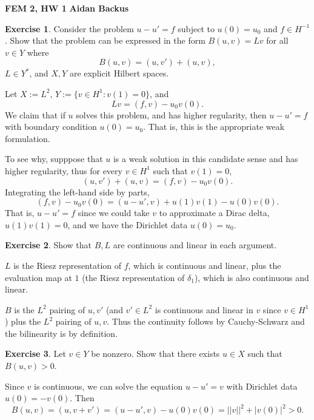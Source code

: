 \documentclass[10pt]{article}
\theoremstyle{definition}
\newtheorem{exer}{Exercise}
\begin{document}
\noindent
\large\textbf{FEM 2, HW 1} \hfill \textbf{Aidan Backus} \\

\begin{exer}
Consider the problem $u - u' = f$ subject to $u(0) = u_0$ and $f \in H^{-1}$.
Show that the problem can be expressed in the form $B(u, v) = Lv$ for all $v \in Y$ where
$$B(u, v) = (u, v') + (u, v),$$
$L \in Y^*$, and $X, Y$ are explicit Hilbert spaces.
\end{exer}

Let $X := L^2$, $Y := \{v \in H^1: v(1) = 0\}$, and
$$Lv = (f, v) - u_0v(0).$$
We claim that if $u$ solves this problem, and has higher regularity, then $u - u' = f$ with boundary condition $u(0) = u_0$.
That is, this is the appropriate weak formulation.

To see why, supppose that $u$ is a weak solution in this candidate sense and has higher regularity, thus for every $v \in H^1$ such that $v(1) = 0$,
$$(u, v') + (u, v) = (f, v) - u_0v(0).$$
Integrating the left-hand side by parts,
$$(f, v) - u_0v(0) = (u - u', v) + u(1)v(1) - u(0)v(0).$$
That is, $u - u' = f$ since we could take $v$ to approximate a Dirac delta, $u(1)v(1) = 0$, and we have the Dirichlet data $u(0) = u_0$.

\begin{exer}
Show that $B, L$ are continuous and linear in each argument.
\end{exer}

$L$ is the Riesz representation of $f$, which is continuous and linear, plus the evaluation map at $1$ (the Riesz representation of $\delta_1$), which is also continuous and linear.

$B$ is the $L^2$ pairing of $u, v'$ (and $v' \in L^2$ is continuous and linear in $v$ since $v \in H^1$) plus the $L^2$ pairing of $u, v$.
Thus the continuity follows by Cauchy-Schwarz and the bilinearity is by definition.

\begin{exer}
Let $v \in Y$ be nonzero. Show that there exists $u \in X$ such that $B(u, v) > 0$.
\end{exer}

Since $v$ is continuous, we can solve the equation $u - u' = v$ with Dirichlet data $u(0) = -v(0)$. Then 
$$B(u, v) = (u, v + v') = (u - u', v) - u(0)v(0) = ||v||^2 + |v(0)|^2 > 0.$$
\end{document}
